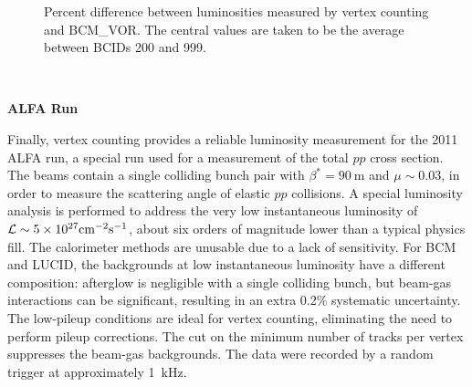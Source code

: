 \begin{figure}[h]
	\centering
	\caption{Percent difference between luminosities measured by vertex counting and BCM\_VOR. The central values are taken to be the average between BCIDs 200 and 999.}
	\label{fig:reco-luminosity-vertexing-muscan}
\end{figure}

\ 

\textbf{ALFA Run}

Finally, vertex counting provides a reliable luminosity measurement for the 2011 ALFA run, a special run used for a measurement of the total $pp$ cross section. The beams contain a single colliding bunch pair with $\beta^{*}=90~\mbox{m}$ and $\mu\sim0.03$, in order to measure the scattering angle of elastic $pp$ collisions. A special luminosity analysis is performed to address the very low instantaneous luminosity of $\mathcal{L}\sim5\times 10^{27} \mathrm{cm}^{-2}\mbox{s}^{-1}$, about six orders of magnitude lower than a typical physics fill. The calorimeter methods are unusable due to a lack of sensitivity. For BCM and LUCID, the backgrounds at low instantaneous luminosity have a different composition: afterglow is negligible with a single colliding bunch, but beam-gas interactions can be significant, resulting in an extra 0.2\% systematic uncertainty. The low-pileup conditions are ideal for vertex counting, eliminating the need to perform pileup corrections. The cut on the minimum number of tracks per vertex suppresses the beam-gas backgrounds. The data were recorded by a random trigger at approximately 1~kHz. 

